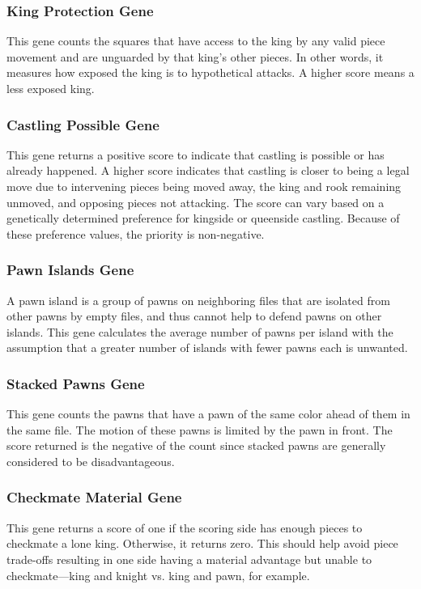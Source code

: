 \documentclass[letterpaper]{article}
\renewcommand{\_}{\allowbreak\textunderscore\allowbreak}
\begin{document}
\subsubsection{King Protection Gene}
This gene counts the squares that have access to the king by any valid piece movement and are unguarded by that king's other pieces. In other words, it measures how exposed the king is to hypothetical attacks. A higher score means a less exposed king.

\subsubsection{Castling Possible Gene}
This gene returns a positive score to indicate that castling is possible or has already happened. A higher score indicates that castling is closer to being a legal move due to intervening pieces being moved away, the king and rook remaining unmoved, and opposing pieces not attacking. The score can vary based on a genetically determined preference for kingside or queenside castling. Because of these preference values, the priority is non-negative.

\subsubsection{Pawn Islands Gene}
A pawn island is a group of pawns on neighboring files that are isolated from other pawns by empty files, and thus cannot help to defend pawns on other islands. This gene calculates the average number of pawns per island with the assumption that a greater number of islands with fewer pawns each is unwanted.

\subsubsection{Stacked Pawns Gene}
This gene counts the pawns that have a pawn of the same color ahead of them in the same file. The motion of these pawns is limited by the pawn in front. The score returned is the negative of the count since stacked pawns are generally considered to be disadvantageous.

\subsubsection{Checkmate Material Gene}
This gene returns a score of one if the scoring side has enough pieces to checkmate a lone king. Otherwise, it returns zero. This should help avoid piece trade-offs resulting in one side having a material advantage but unable to checkmate---king and knight vs\@. king and pawn, for example.
\end{document}
